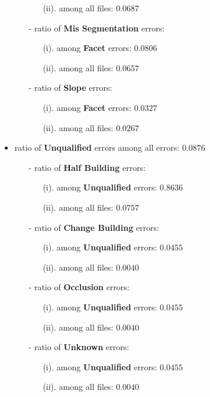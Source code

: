 \documentclass[a4paper, 11pt]{article}
\begin{document}
\begin{itemize}
\begin{itemize}
\begin{itemize}
				\item[(ii).] among all files:   $0.0687$
			\end{itemize}
			\item[-] ratio of \textbf{Mis Segmentation} errors:
			\begin{itemize}
				\item[(i).] among \textbf{Facet} errors:  $0.0806$
				\item[(ii).] among all files:  $0.0657$
			\end{itemize}
			\item[-] ratio of \textbf{Slope} errors:
			\begin{itemize}
				\item[(i).] among \textbf{Facet} errors:  $0.0327$
				\item[(ii).] among all files:  $0.0267$
			\end{itemize}
		\end{itemize}
		\item ratio of \textbf{Unqualified} errors among all errors: $0.0876$
		\begin{itemize}
			\item[-] ratio of \textbf{Half Building} errors:
			\begin{itemize}
				\item[(i).] among \textbf{Unqualified} errors:  $0.8636$
				\item[(ii).] among all files:  $0.0757$
			\end{itemize}
			\item[-] ratio of \textbf{Change Building} errors:
			\begin{itemize}
				\item[(i).] among \textbf{Unqualified} errors:  $0.0455$
				\item[(ii).] among all files:   $0.0040$
			\end{itemize}
			\item[-] ratio of \textbf{Occlusion} errors:
			\begin{itemize}
				\item[(i).] among \textbf{Unqualified} errors:  $0.0455$
				\item[(ii).] among all files:  $0.0040$
			\end{itemize}
			\item[-] ratio of \textbf{Unknown} errors:
			\begin{itemize}
				\item[(i).] among \textbf{Unqualified} errors:   $0.0455$
				\item[(ii).] among all files:  $0.0040$
			\end{itemize}
		\end{itemize}
	\end{itemize}
\end{document}
